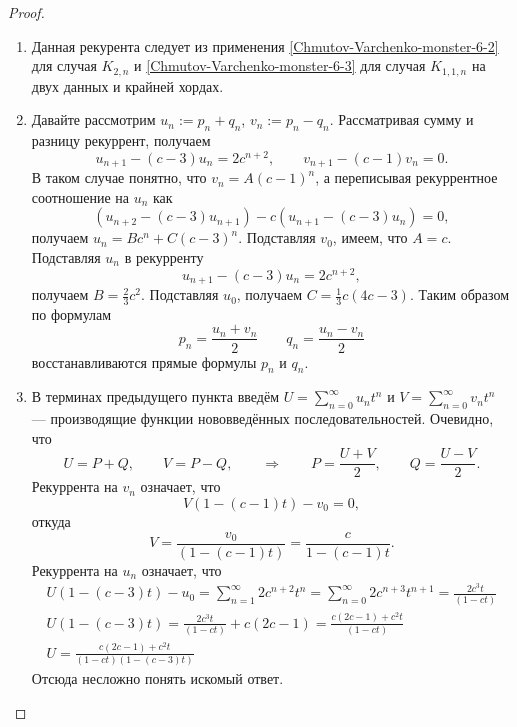 \documentclass[12pt,a4paper]{article}
\begin{document}
    \begin{proof}\ 
        \begin{enumerate}
            \item Данная рекурента следует из применения \ref{Chmutov-Varchenko-monster-6-2} для случая $K_{2, n}$ и \ref{Chmutov-Varchenko-monster-6-3} для случая $K_{1,1,n}$ на двух данных и крайней хордах.
            \item Давайте рассмотрим $u_n := p_n + q_n$, $v_n := p_n - q_n$. Рассматривая сумму и разницу рекуррент, получаем
                \[
                    u_{n+1} - (c-3) u_n = 2 c^{n+2},
                    \qquad
                    v_{n+1} - (c-1) v_n = 0.
                \]
                В таком случае понятно, что $v_n = A (c-1)^n$, а переписывая рекуррентное соотношение на $u_n$ как
                \[(u_{n+2} - (c-3) u_{n+1}) - c(u_{n+1} - (c-3) u_n) = 0,\]
                получаем $u_n = B c^n + C (c-3)^n$. Подставляя $v_0$, имеем, что $A = c$. Подставляя $u_n$ в рекурренту
                \[u_{n+1} - (c-3) u_n = 2c^{n+2},\]
                получаем $B = \frac{2}{3}c^2$. Подставляя $u_0$, получаем $C = \frac{1}{3}c(4c-3)$. Таким образом по формулам
                \[p_n = \frac{u_n + v_n}{2} \qquad q_n = \frac{u_n - v_n}{2}\]
                восстанавливаются прямые формулы $p_n$ и $q_n$.
            \item В терминах предыдущего пункта введём $U = \sum_{n=0}^\infty u_n t^n$ и $V = \sum_{n=0}^\infty v_n t^n$ --- производящие функции нововведённых последовательностей. Очевидно, что
                \[U = P + Q, \qquad V = P - Q, \qquad \Longrightarrow \qquad P = \frac{U + V}{2}, \qquad Q = \frac{U - V}{2}.\]
                Рекуррента на $v_n$ означает, что
                \[V(1 - (c-1) t) - v_0 = 0,\]
                откуда
                \[V = \frac{v_0}{(1 - (c-1)t)} = \frac{c}{1 - (c-1)t}.\]
                Рекуррента на $u_n$ означает, что
                \begin{gather*}
                    U(1 - (c-3)t) - u_0
                    = \sum_{n=1}^\infty 2c^{n+2} t^n
                    = \sum_{n=0}^\infty 2c^{n+3} t^{n+1}
                    = \frac{2c^3 t}{(1-ct)}\\
                    U(1 - (c-3)t)
                    = \frac{2c^3 t}{(1-ct)} + c(2c-1)
                    = \frac{c(2c-1) + c^2 t}{(1-ct)}\\
                    U
                    = \frac{c(2c-1) + c^2 t}{(1-ct)(1-(c-3)t)}
                \end{gather*}
                Отсюда несложно понять искомый ответ.
        \end{enumerate}
    \end{proof}
\end{document}
